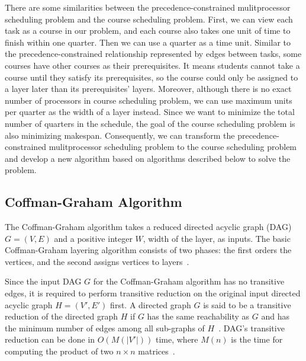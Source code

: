 \documentclass[letterpaper,12pt]{article}
\theoremstyle{definition}
\begin{document}
There are some similarities between the precedence-constrained mulitprocessor scheduling problem and the course scheduling problem. First, we can view each task as a course in our problem, and each course also takes one unit of time to finish within one quarter. Then we can use a quarter as a time unit. Similar to the precedence-constrained relationship represented by edges between tasks, some courses have other courses as their prerequisites. It means students cannot take a course until they satisfy its prerequisites, so the course could only be assigned to a layer later than its prerequisites' layers. Moreover, although there is no exact number of processors in course scheduling problem, we can use maximum units per quarter as the width of a layer instead. Since we want to minimize the total number of quarters in the schedule, the goal of the course scheduling problem is also minimizing makespan. Consequently, we can transform the precedence-constrained mulitprocessor scheduling problem to the course scheduling problem and develop a new algorithm based on algorithms described below to solve the problem. 

\subsection{Coffman-Graham Algorithm}
The Coffman-Graham algorithm takes a reduced directed acyclic graph (DAG) $G=(V,E)$ and a positive integer $W$, width of the layer, as inputs. The basic Coffman-Graham layering algorithm consists of two phases: the first orders the vertices, and the second assigns vertices to layers~\cite{battista_chapter_1998}.

Since the input DAG $G$ for the Coffman-Graham algorithm has no transitive edges, it is required to perform transitive reduction on the original input directed acyclic graph $H=(V',E')$ first. A directed graph $G$ is said to be a transitive reduction of the directed graph $H$ if $G$ has the same reachability as $G$ and has the minimum number of edges among all sub-graphs of $H$~\cite{aho_transitive_1972}.
DAG's transitive reduction can be done in $O(M(|V'|))$ time, where $M(n)$ is the time for computing the product of two $n \times n$ matrices~\cite{ aho_transitive_1972, tamassia_handbook_2007}.
\end{document}
